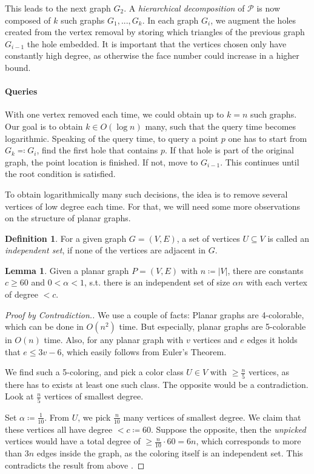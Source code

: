 \documentclass[10pt]{article}
\theoremstyle{definition}
\newtheorem{definition}{Definition}
\newtheorem{lemma}{Lemma}
\theoremstyle{remark}
\begin{document}
This leads to the next graph \(G_2\). A \emph{hierarchical decomposition} of \(\mathcal{P}\) is now composed of \(k\) such graphs \(G_1, ..., G_k\). In each graph \(G_i\), we augment the holes created from the vertex removal by storing which triangles of the previous graph \(G_{i-1}\) the hole embedded. It is important that the vertices chosen only have constantly high degree, as otherwise the face number could increase in a higher bound.

\paragraph{Queries} With one vertex removed each time, we could obtain up to \(k = n\) such graphs. Our goal is to obtain \(k \in O(\log{n})\) many, such that the query time becomes logarithmic. Speaking of the query time, to query a point \(p\) one has to start from \(G_k \eqqcolon G_i\), find the first hole that contains \(p\). If that hole is part of the original graph, the point location is finished. If not, move to \(G_{i-1}\). This continues until the root condition is satisfied.

To obtain logarithmically many such decisions, the idea is to remove several vertices of low degree each time. For that, we will need some more observations on the structure of planar graphs.

\begin{definition}
    For a given graph \(G = (V, E)\), a set of vertices \(U \subseteq V\) is called an \emph{independent set}, if none of the vertices are adjacent in \(G\).
\end{definition}


\begin{lemma}
    Given a planar graph \(P = (V, E)\) with \(n \coloneqq |V|\), there are constants \(c \geq 60\) and \(0 < \alpha < 1\), s.t. there is an independent set of size \(\alpha n\) with each vertex of degree \(< c\).
\end{lemma}

\begin{proof}[Proof by Contradiction.]
    We use a couple of facts: Planar graphs are 4-colorable, which can be done in \(O(n^2)\) time. But especially, planar graphs are 5-colorable in \(O(n)\) time. Also, for any planar graph with \(v\) vertices and \(e\) edges it holds that \(e \leq 3v - 6\), which easily follows from Euler's Theorem.
    
    We find such a 5-coloring, and pick a color class \(U \in V\) with \(\geq \frac{n}{5}\) vertices, as there has to exists at least one such class. The opposite would be a contradiction. Look at \(\frac{n}{5}\) vertices of smallest degree.

    Set \(\alpha \coloneqq \frac{1}{10}\). From \(U\), we pick \(\frac{n}{10}\) many vertices of smallest degree. We claim that these vertices all have degree \(< c \coloneqq 60\). Suppose the opposite, then the \emph{unpicked} vertices would have a total degree of \(\geq \frac{n}{10} \cdot 60 = 6n\), which corresponds to more than \(3n\) edges inside the graph, as the coloring itself is an independent set. This contradicts the result from above \lightning.
\end{proof}
\end{document}
